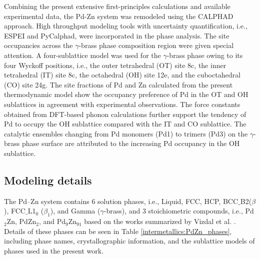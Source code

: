 Combining the present extensive first-principles calculations and available experimental data, the Pd-Zn system was remodeled using the CALPHAD approach. High throughput modeling tools with uncertainty quantification, i.e., ESPEI and PyCalphad, were incorporated in the phase analysis. The site occupancies across the $\gamma$-brass phase composition region were given special attention. A four-sublattice model was used for the $\gamma$-brass phase owing to its four Wyckoff positions, i.e., the outer tetrahedral (OT) site 8c, the inner tetrahedral (IT) site 8c, the octahedral (OH) site 12e, and the cuboctahedral (CO) site 24g. The site fractions of Pd and Zn calculated from the present thermodynamic model show the occupancy preference of Pd in the OT and OH sublattices in agreement with experimental observations. The force constants obtained from DFT-based phonon calculations further support the tendency of Pd to occupy the OH sublattice compared with the IT and CO sublattice. The catalytic ensembles changing from Pd monomers (Pd1) to trimers (Pd3) on the $\gamma$-brass phase surface are attributed to the increasing Pd occupancy in the OH sublattice.

\subsection{Modeling details} \label{intermetallics:ssec:PdZnmodel}
The Pd–Zn system contains 6 solution phases, i.e., Liquid, FCC, HCP, BCC$\_$B2($\beta$), FCC$\_$L1$_0$ ($\beta_1$), and Gamma ($\gamma$-brass), and 3 stoichiometric compounds, i.e., Pd$_2$Zn, PdZn$_2$, and Pd$_9$Zn$_{91}$ based on the works summarized by Vizdal et al. \cite{vizdal2006experimental}. Details of these phases can be seen in Table \ref{intermetallics:PdZn_phases}, including phase names, crystallographic information, and the sublattice models of phases used in the present work.

